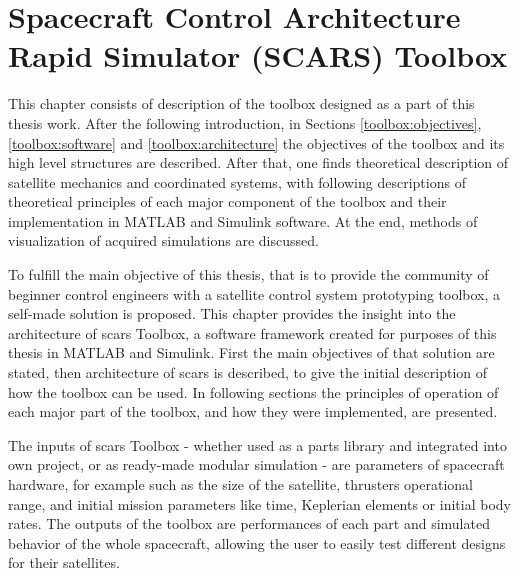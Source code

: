 \section{Spacecraft Control Architecture \protect\\ Rapid Simulator (SCARS) Toolbox}\label{sec:toolbox}
    This chapter consists of description of the toolbox designed as a part of this thesis work. After the following introduction, in Sections \ref{toolbox:objectives}, \ref{toolbox:software} and \ref{toolbox:architecture} the objectives of the toolbox and its high level structures are described. After that, one finds theoretical description of satellite mechanics and coordinated systems, with following descriptions of theoretical principles of each major component of the toolbox and their implementation in MATLAB and Simulink software. At the end, methods of visualization of acquired simulations are discussed.  

    To fulfill the main objective of this thesis, that is to provide the community of beginner control engineers with a satellite control system prototyping toolbox, a self-made solution is proposed. This chapter provides the insight into the architecture of \ac*{scars} Toolbox, a software framework created for purposes of this thesis in MATLAB and Simulink. First the main objectives of that solution are stated, then architecture of \ac{scars} is described, to give the initial description of how the toolbox can be used. In following sections the principles of operation of each major part of the toolbox, and how they were implemented, are presented.

    The inputs of \ac{scars} Toolbox - whether used as a parts library and integrated into own project, or as ready-made modular simulation - are parameters of spacecraft hardware, for example such as the size of the satellite, thrusters operational range, and initial mission parameters like time, Keplerian elements or initial body rates. The outputs of the toolbox are performances of each part and simulated behavior of the whole spacecraft, allowing the user to easily test different designs for their satellites.

